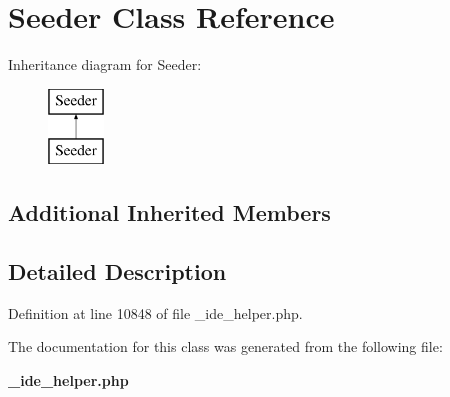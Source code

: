 \section{Seeder Class Reference}
\label{class_seeder}
Inheritance diagram for Seeder\+:\begin{figure}[H]
\begin{center}
\leavevmode
\includegraphics[height=2.000000cm]{class_seeder}
\end{center}
\end{figure}
\subsection*{Additional Inherited Members}


\subsection{Detailed Description}


Definition at line 10848 of file \+\_\+ide\+\_\+helper.\+php.



The documentation for this class was generated from the following file\+:\begin{DoxyCompactItemize}
\item 
{\bf \+\_\+ide\+\_\+helper.\+php}\end{DoxyCompactItemize}
